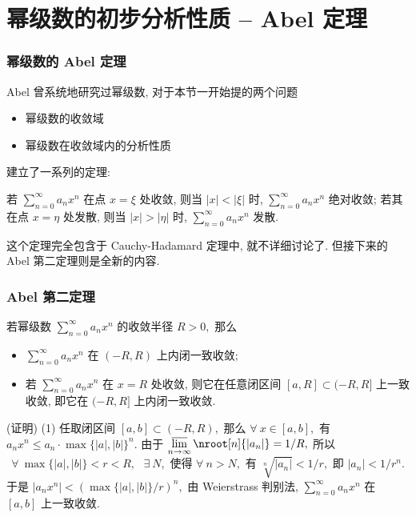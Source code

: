
\section{幂级数的初步分析性质 -- Abel 定理}


\begin{frame}
\frametitle{幂级数的 Abel 定理}

Abel 曾系统地研究过幂级数, 对于本节一开始提的两个问题
\begin{itemize}
\item 幂级数的收敛域
\item 幂级数在收敛域内的分析性质
\end{itemize}
建立了一系列的定理:

\pause
\vspace{1em}

\begin{thm}
若 $\sum_{n=0}^{\infty} a_n x^n$ 在点 $x = \xi$ 处收敛, 则当 $|x| < |\xi|$ 时, $\sum_{n=0}^{\infty} a_n x^n$ 绝对收敛; 若其在点 $x = \eta$ 处发散, 则当 $|x| > |\eta|$ 时, $\sum_{n=0}^{\infty} a_n x^n$ 发散.
\end{thm}

这个定理完全包含于 Cauchy-Hadamard 定理中, 就不详细讨论了. 但接下来的 Abel 第二定理则是全新的内容.

\end{frame}


\begin{frame}
\frametitle{Abel 第二定理}

\begin{thm}
若幂级数 $\displaystyle \sum_{n=0}^{\infty} a_n x^n$ 的收敛半径 $R > 0,$ 那么
\begin{itemize}
\item $\displaystyle \sum_{n=0}^{\infty} a_n x^n$ 在 $(-R, R)$ 上内闭一致收敛;
\item 若 $\displaystyle \sum_{n=0}^{\infty} a_n x^n$ 在 $x = R$ 处收敛, 则它在任意闭区间 $[a, R] \subset (-R, R]$ 上一致收敛, 即它在 $(-R, R]$ 上内闭一致收敛.
\end{itemize}
\end{thm}

\pause

\startproof[bg=yellow, fg=red](证明)
(1) 任取闭区间 $[a, b] \subset (-R, R),$ 那么 $\forall ~ x \in [a, b],$ 有 $a_n x^n \leqslant a_n \cdot \max\{|a|, |b|\}^n.$ 由于 $\displaystyle \varlimsup_{n\to\infty} \nroot[n]{|a_n|} = 1/R,$ 所以
\[
\text{$\forall ~ \max\{|a|, |b|\} < r < R,$ $\exists ~ N,$ 使得 $\forall ~ n > N,$ 有 $\sqrt[n]{|a_n|} < 1/r,$ 即 $|a_n| < 1/r^n.$}
\]
于是 $\left| a_n x^n \right| < \left( \max\{|a|, |b|\} / r \right)^n,$ 由 Weierstrass 判别法, $\displaystyle \sum_{n=0}^{\infty} a_n x^n$ 在 $[a, b]$ 上一致收敛.

\end{frame}

